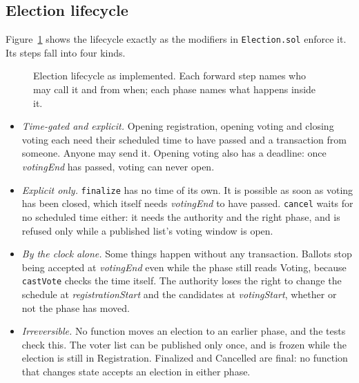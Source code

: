 \subsection{Election lifecycle}\label{sec:lifecycle}

Figure~\ref{fig:lifecycle-final} shows the lifecycle exactly as the modifiers
in \texttt{Election.sol} enforce it. Its steps fall into four kinds.

\begin{figure}[tb]
  \centering
  \resizebox{0.92\textwidth}{!}{}
  \caption{Election lifecycle as implemented. Each forward step names who may
    call it and from when; each phase names what happens inside it.}
  \label{fig:lifecycle-final}
\end{figure}

\begin{itemize}
  \item \emph{Time-gated and explicit.} Opening registration, opening voting
        and closing voting each need their scheduled time to have passed and a
        transaction from someone. Anyone may send it. Opening voting also has a
        deadline: once \emph{votingEnd} has passed, voting can never open.
  \item \emph{Explicit only.} \texttt{finalize} has no time of its own. It is
        possible as soon as voting has been closed, which itself needs
        \emph{votingEnd} to have passed. \texttt{cancel} waits for no scheduled
        time either: it needs the authority and the right phase, and is refused
        only while a published list's voting window is open.
  \item \emph{By the clock alone.} Some things happen without any
        transaction. Ballots stop being accepted at \emph{votingEnd} even while
        the phase still reads Voting, because \texttt{castVote} checks the time
        itself. The authority loses the right to change the schedule at
        \emph{registrationStart} and the candidates at \emph{votingStart},
        whether or not the phase has moved.
  \item \emph{Irreversible.} No function moves an election to an earlier
        phase, and the tests check this. The voter list can be published only
        once, and is frozen while the election is still in Registration.
        Finalized and Cancelled are final: no function that changes state
        accepts an election in either phase.
\end{itemize}

